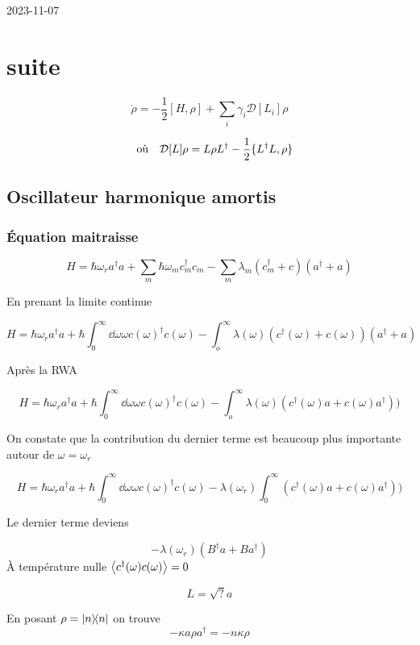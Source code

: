 


2023-11-07

\section*{suite}

\[\dot \rho = - \frac{1}{2} [H, \rho] +\sum_i \gamma_i \mathcal{D} [L_i]\rho\]

\[ \qq{où} \mathcal{D}[L] \rho = L\rho L^{\dagger} - \frac{1}{2} \{ L^{\dagger}L, \rho \}  \]

\setcounter{section}{5}
\setcounter{subsection}{2}
\subsection{Oscillateur harmonique amortis}
\subsubsection{Équation maitraisse}
\[ H = \hbar \omega_r a^{\dagger} a + \sum_m \hbar \omega_m c_m^{\dagger}c_m  - \sum_m \lambda_m (c^{\dagger}_m + c)(a^{\dagger}+a) \]

En prenant la limite continue 


\[ H = \hbar \omega_r a^{\dagger} a + \hbar\int_0^\infty \dd\omega \omega c(\omega)^{\dagger}c(\omega)  - \int_o^\infty \lambda(\omega) (c^{\dagger}(\omega) + c(\omega))(a^{\dagger}+a) \]

Après la RWA

\[ H = \hbar \omega_r a^{\dagger} a + \hbar\int_0^\infty \dd\omega \omega c(\omega)^{\dagger}c(\omega)  - \int_o^\infty \lambda(\omega) (c^{\dagger}(\omega)a + c(\omega) a^{\dagger}) )\]

On constate que la contribution du dernier terme est beaucoup plus importante autour de $\omega = \omega_r $

\[ H = \hbar \omega_r a^{\dagger} a + \hbar\int_0^\infty \dd\omega \omega c(\omega)^{\dagger}c(\omega)  - \lambda(\omega_r)\int_0^\infty  (c^{\dagger}(\omega)a + c(\omega) a^{\dagger}) )\]

Le dernier terme deviens

\[ -\lambda(\omega_r) \left( B^{\dagger} a + B a ^{\dagger} \right) \]
À température nulle $\expval{c^{\dagger}(\omega) c(\omega)} =0 $


\[ \boxed{L = \sqrt{?}a} \]

En posant $\rho = \ketbra{n}$ on trouve \[ -\kappa a \rho a^{\dagger} = -n \kappa \rho \]

